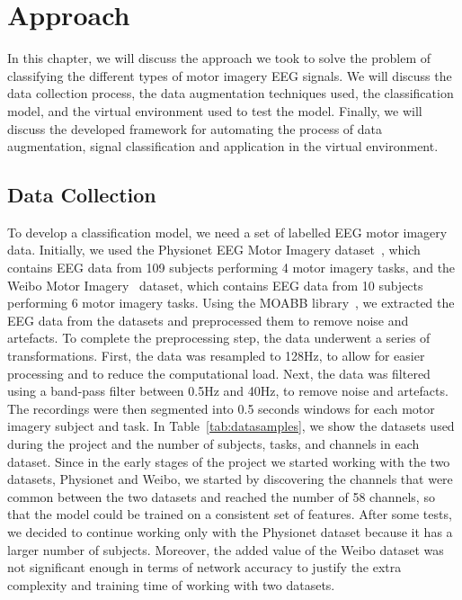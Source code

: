 \chapter{Approach}\label{ch:approach}
In this chapter, we will discuss the approach we took to solve the problem of classifying the different types of motor imagery EEG signals.
We will discuss the data collection process, the data augmentation techniques used, the classification model, and the virtual environment used to test the model. 
Finally, we will discuss the developed framework for automating the process of data augmentation, signal classification and application in the virtual environment.

\section{Data Collection}
To develop a classification model, we need a set of labelled EEG motor imagery data.
Initially, we used the Physionet EEG Motor Imagery dataset~\cite{goldberger2000physiobank}, which contains EEG data from 109 subjects performing 4 motor imagery tasks, and the Weibo Motor Imagery~\cite{yi2014evaluation} dataset, which contains EEG data from 10 subjects performing 6 motor imagery tasks.
Using the MOABB library~\cite{Aristimunha_Mother_of_all_2023, chevallier2024largest, jayaram2018moabb}, we extracted the EEG data from the datasets and preprocessed them to remove noise and artefacts.
To complete the preprocessing step, the data underwent a series of transformations.
First, the data was resampled to 128Hz, to allow for easier processing and to reduce the computational load.
Next, the data was filtered using a band-pass filter between 0.5Hz and 40Hz, to remove noise and artefacts.
The recordings were then segmented into 0.5 seconds windows for each motor imagery subject and task.
In Table~\ref{tab:datasamples}, we show the datasets used during the project and the number of subjects, tasks, and channels in each dataset.
Since in the early stages of the project we started working with the two datasets, Physionet and Weibo, we started by discovering the channels that were common between the two datasets and reached the number of 58 channels, so that the model could be trained on a consistent set of features.
After some tests, we decided to continue working only with the Physionet dataset because it has a larger number of subjects.
Moreover, the added value of the Weibo dataset was not significant enough in terms of network accuracy to justify the extra complexity and training time of working with two datasets.
